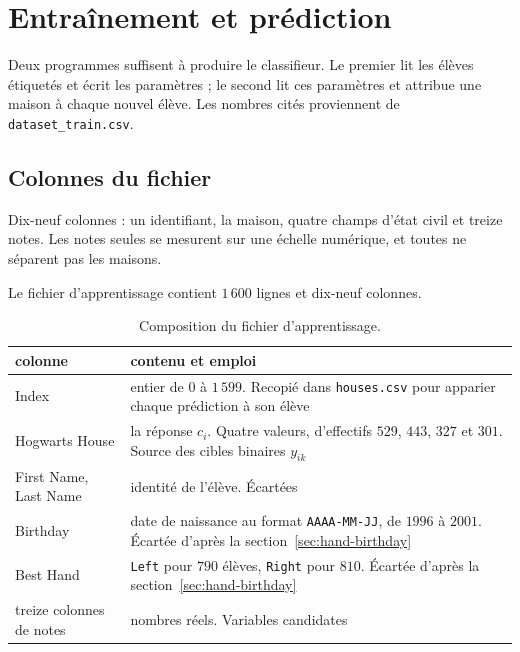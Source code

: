 \chapter{Entraînement et prédiction}
\label{ch:implementation}

\begin{lecture}
Deux programmes suffisent à produire le classifieur. Le premier lit les élèves
étiquetés et écrit les paramètres ; le second lit ces paramètres et attribue une
maison à chaque nouvel élève. Les nombres cités proviennent de
\texttt{dataset\_train.csv}.
\end{lecture}

\section{Colonnes du fichier}
\label{sec:features}

\begin{lecture}
Dix-neuf colonnes : un identifiant, la maison, quatre champs d'état civil et
treize notes. Les notes seules se mesurent sur une échelle numérique, et toutes
ne séparent pas les maisons.
\end{lecture}

Le fichier d'apprentissage contient $1\,600$ lignes et dix-neuf colonnes.

\begin{table}[htbp]
\centering
\begin{tabularx}{\textwidth}{>{\ttfamily\footnotesize}l X}
\toprule
\textrm{colonne} & \textrm{contenu et emploi} \\
\midrule
Index & entier de $0$ à $1\,599$. Recopié dans \texttt{houses.csv} pour apparier chaque prédiction à son élève \\
Hogwarts House & la réponse $c_i$. Quatre valeurs, d'effectifs $529$, $443$, $327$ et $301$. Source des cibles binaires $y_{ik}$ \\
First Name, Last Name & identité de l'élève. Écartées \\
Birthday & date de naissance au format \texttt{AAAA-MM-JJ}, de $1996$ à $2001$. Écartée d'après la section~\ref{sec:hand-birthday} \\
Best Hand & \texttt{Left} pour $790$ élèves, \texttt{Right} pour $810$. Écartée d'après la section~\ref{sec:hand-birthday} \\
\textrm{treize colonnes de notes} & nombres réels. Variables candidates \\
\bottomrule
\end{tabularx}
\caption{Composition du fichier d'apprentissage.}
\label{tab:columns}
\end{table}

